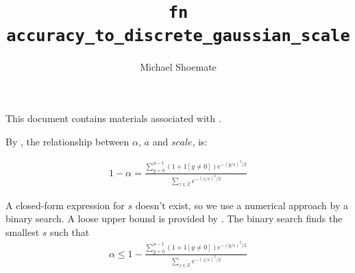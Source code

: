 \documentclass{article}
\title{\texttt{fn accuracy\_to\_discrete\_gaussian\_scale}}
\author{Michael Shoemate}
\begin{document}
\maketitle

This document contains materials associated with .

By ,
the relationship between $\alpha$, $a$ and $scale$, is:

\begin{align*}
    1 - \alpha = \frac{\sum_{y=0}^{a - 1} (1 + 1[y \ne 0]) e^{-(y/s)^2/2}}{\sum_{z \in \mathbb{Z}} e^{-(z/s)^2/2}}
\end{align*}

A closed-form expression for $s$ doesn't exist,
so we use a numerical approach by a binary search.
A loose upper bound is provided by .
The binary search finds the smallest $s$ such that
\begin{align*}
    \alpha \le 1 - \frac{\sum_{y=0}^{a - 1} (1 + 1[y \ne 0]) e^{-(y/s)^2/2}}{\sum_{z \in \mathbb{Z}} e^{-(z/s)^2/2}}
\end{align*}
\end{document}

